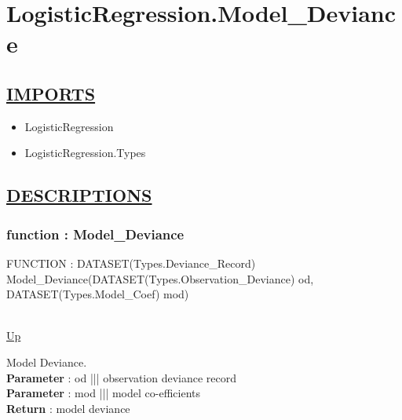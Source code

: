 \chapter*{LogisticRegression.Model\_Deviance}
\hypertarget{LogisticRegression.Model_Deviance}{}

\section*{\underline{IMPORTS}}
\begin{itemize}
\item LogisticRegression
\item LogisticRegression.Types
\end{itemize}

\section*{\underline{DESCRIPTIONS}}
\subsection*{function : Model\_Deviance}
\hypertarget{ecldoc:logisticregression.model_deviance}{FUNCTION : DATASET(Types.Deviance\_Record) Model\_Deviance(DATASET(Types.Observation\_Deviance) od, DATASET(Types.Model\_Coef) mod)} \\
\hyperlink{ecldoc:}{Up} \\
\par
Model Deviance. \\
\textbf{Parameter} : od ||| observation deviance record \\
\textbf{Parameter} : mod ||| model co-efficients \\
\textbf{Return} : model deviance \\
